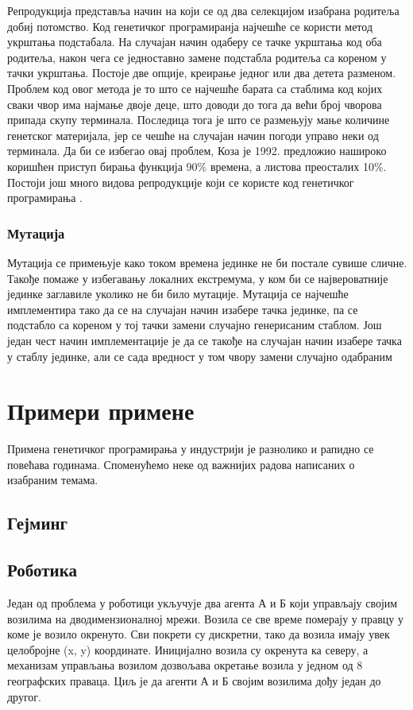 \documentclass[a4paper]{article}
\begin{document}
Репродукција представља начин на који се од два селекцијом изабрана родитеља добиј потомство. Код генетичког програмиранја најчешће се користи метод укрштања подстабала. На случајан начин одаберу се тачке укрштања код оба родитеља, након чега се једноставно замене подстабла родитеља са кореном у тачки укрштања. Постоје две опције, креирање једног или два детета разменом. Проблем код овог метода је то што се најчешће барата са стаблима код којих сваки чвор има најмање двоје деце, што доводи до тога да већи број чворова припада скупу терминала. Последица тога је што се размењују мање количине генетског материјала, јер се чешће на случајан начин погоди управо неки од терминала. Да би се избегао овај проблем, Коза је 1992. предложио нашироко коришћен приступ бирања функција 90\% времена, а листова преосталих 10\%. Постоји још много видова репродукције који се користе код генетичког програмирања \cite{fieldGuidetoGP}.

\subsubsection{Мутација}
\label{sec:mutacija}

Мутација се примењује како током времена јединке не би постале сувише сличне. Такође помаже у избегавању локалних екстремума, у ком би се највероватније јединке заглавиле уколико не би било мутације.
Мутација се најчешће имплементира тако да се на случајан начин изабере тачка јединке, па се подстабло са кореном у тој тачки замени случајно генерисаним стаблом. Још један чест начин имплементације је да се такође на случајан начин изабере тачка у стаблу јединке, али се сада вредност у том чвору замени случајно одабраним

\section{Примери примене}
Примена генетичког програмирања у индустрији је разнолико и рапидно се повећава годинама. Споменућемо неке од важнијих радова написаних о изабраним темама.
\subsection{Гејминг}
\subsection{Роботика}
Један од проблема у роботици укључује два агента А и Б који управљају својим возилима на дводимензионалној мрежи. Возила се све време померају у правцу у коме је возило окренуто. Сви покрети су дискретни, тако да возила имају увек целобројне (x, y) координате. Иницијално возила су окренута ка северу, а механизам управљања возилом дозвољава окретање возила у једном од 8 географских праваца. Циљ је да агенти А и Б својим возилима дођу један до другог.
\end{document}
